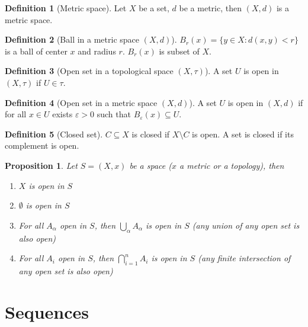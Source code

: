 \documentclass{article}
\newenvironment{enumrom}{\begin{enumerate}[label=(\roman*)]}{\end{enumerate}}
\theoremstyle{definition}
\newtheorem{definition}{Definition}[section]
\theoremstyle{definition}
\theoremstyle{plain}
\theoremstyle{plain}
\theoremstyle{plain}
\theoremstyle{plain}
\newtheorem{proposition}[theorem]{Proposition}
\theoremstyle{definition}
\theoremstyle{remark}
\theoremstyle{remark}
\theoremstyle{remark}
\theoremstyle{remark}
\newcommand{\E}{\varepsilon}
\begin{document}
\begin{definition}[Metric space]
  Let $X$ be a set, $d$ be a metric, then $(X, d)$ is a metric space.
\end{definition}


\begin{definition}[Ball in a metric space $(X, d)$]
  $B_r(x) = \{ y \in X : d(x,y) < r \}$ is a ball of center $x$ and radius $r$. $B_r(x)$ is subset of $X$.
\end{definition}


\begin{definition}[Open set in a topological space $(X, \tau)$]
  A set $U$ is open in $(X, \tau)$ if $U \in \tau$.
\end{definition}


\begin{definition}[Open set in a metric space $(X, d)$]
  A set $U$ is open in $(X, d)$ if for all $x \in U$ exists $\E > 0$ such that $B_\E(x) \subseteq U$.
\end{definition}


\begin{definition}[Closed set]
  $C \subseteq X$ is closed if $X\setminus C$ is open. A set is closed if its complement is open.
\end{definition}


\begin{proposition}
  Let $S = (X, x)$ be a space ($x$ a metric or a topology), then
  \begin{enumrom}
  \item $X$ is open in $S$
  \item $\emptyset$ is open in $S$
  \item For all $A_\alpha$ open in $S$, then $\displaystyle \bigcup_\alpha A_\alpha$ is open in $S$ (any union of any open set is also open)
  \item For all $A_i$ open in $S$, then $\displaystyle \bigcap_{i=1}^n A_i$ is open in $S$ (any finite intersection of any open set is also open)
  \end{enumrom}
\end{proposition}


\section{Sequences}
\end{document}
